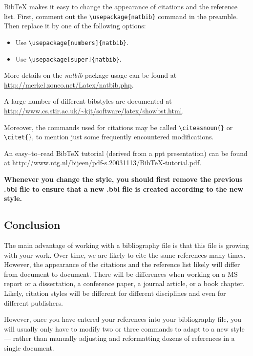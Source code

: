 \documentclass[12pt]{article}
\begin{document}
BibTeX makes it easy to change the appearance of citations 
and the reference list. First, comment out the 
\verb|\usepackage{natbib}| command in the preamble.
Then replace it by one of the following options:

\begin{itemize}
\item Use \verb|\usepackage[numbers]{natbib}|.
\item Use \verb|\usepackage[super]{natbib}|.
\end{itemize}

More details on the {\it natbib} package usage can be found at
\url{http://merkel.zoneo.net/Latex/natbib.php}.

A large number of different bibstyles are
documented at 
\url{http://www.cs.stir.ac.uk/~kjt/software/latex/showbst.html}.

Moreover, the commands used for citations may be called
\verb|\citeasnoun{}| or \verb|\citet{}|, to mention just some
frequently encountered modifications.

An easy--to--read BibTeX tutorial (derived from a ppt presentation) 
can be found at 
\url{http://www.ntg.nl/bijeen/pdf-s.20031113/BibTeX-tutorial.pdf}.

{\bf Whenever you change the style, you should first
remove the previous .bbl file to ensure that a new .bbl file
is created according to the new style.}


\subsection{Conclusion}

The main advantage of working with a bibliography file is that this
file is growing with your work. Over time, we are likely to cite
the same references many times. However, the appearance
of the citations and the reference list likely will differ from
document to document. There will be differences
when working on a MS report or a dissertation, a conference paper,
a journal article, or a book chapter. Likely, citation styles will be different
for different disciplines and even for different publishers.

However, once you have entered your references into your bibliography file,
you will usually only have to modify two or three commands
to adapt to a new style --- rather than manually adjusting
and reformatting dozens of references in a single document.



\end{document}
